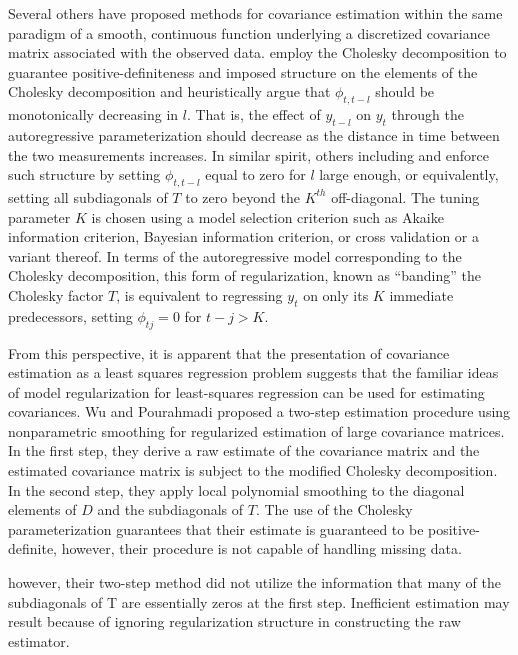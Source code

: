 \documentclass[12pt]{article}
\theoremstyle{definition}
\begin{document}
{{\bigskip
Several others have proposed methods for covariance estimation within the same paradigm of a smooth, continuous function underlying a discretized covariance matrix associated with the observed data.   \citet{pourahmadi1999joint} employ the Cholesky decomposition to guarantee positive-definiteness and imposed structure on the elements of the Cholesky decomposition and heuristically argue that $\phi_{t,t-l}$ should be monotonically decreasing in $l$. That is, the effect of $y_{t-l}$ on $y_t$ through the autoregressive parameterization should decrease as the distance in time between the two measurements increases. In similar spirit, others including \citet{bickel2008regularized} and \citet{levina2008sparse} enforce such structure by setting $\phi_{t,t-l}$ equal to zero for $l$ large enough, or equivalently, setting all subdiagonals of $T$ to zero beyond the $K^{th}$ off-diagonal. The tuning parameter $K$ is chosen using a model selection criterion such as Akaike information criterion, Bayesian information criterion, or cross validation or a variant thereof.  In terms of the autoregressive model corresponding to the Cholesky decomposition, this form of regularization, known as ``banding'' the Cholesky factor $T$, is equivalent to regressing $y_t$ on only its $K$ immediate predecessors, setting $\phi_{tj} = 0$ for $t-j>K$. 

\bigskip

From this perspective, it is apparent that the presentation of covariance estimation as a least squares regression problem suggests that the familiar ideas of model regularization for least-squares regression can be used for estimating covariances.  Wu and Pourahmadi \citet{wu2003nonparametric} proposed a two-step estimation procedure using nonparametric smoothing for regularized estimation of large covariance matrices.  In the first step, they derive a raw estimate of the covariance matrix and the estimated covariance matrix is subject to the modified Cholesky decomposition. In the second step, they apply local polynomial smoothing to the diagonal elements of $D$ and the subdiagonals of $T$. The use of the Cholesky parameterization guarantees that their estimate is guaranteed to be positive-definite, however, their procedure is not capable of handling missing data. \citet{huang2007estimation} 

however, their two-step method did not utilize the information that many of the subdiagonals of T are essentially zeros at the first step. Inefficient estimation may result because of ignoring regularization structure in constructing the raw estimator. 

}}
\end{document}
